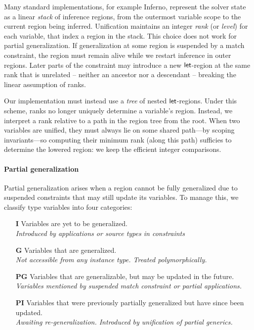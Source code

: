 \documentclass[acmsmall,screen,nonacm,review]{acmart}
\begin{document}

Many standard \ML implementations, for example Inferno, represent the
solver state as a linear \emph{stack} of inference regions, from the
outermost variable scope to the current region being inferred. Unification maintains an integer \emph{rank} (or \emph{level}) for each variable, that index a region in the stack.
%
This choice does not work for partial generalization. If
generalization at some region is suspended by a match constraint, the
region must remain alive while we restart inference in outer
regions. Later parts of the constraint may introduce a new
$\mathopen{}\mathrel{\mathsf{let}}$-region at the same rank that is unrelated -- neither an
ancestor nor a descendant -- breaking the linear assumption of ranks.

Our implementation must instead use a \emph{tree} of nested
$\mathopen{}\mathrel{\mathsf{let}}$-regions. Under this scheme, ranks no longer uniquely determine
a variable's region. Instead, we interpret a rank relative to a path in the region tree from the root. When two variables are
unified, they must always lie on some shared path---by scoping
invariants---so computing their minimum rank (along this path)
sufficies to determine the lowered region: we keep the efficient integer comparisons.

\paragraph{Partial generalization}

Partial generalization arises when a region cannot be fully
generalized due to suspended constraints that may still update
its variables. To manage this, we classify type variables
into four categories:

\begin{itemize}
  \item[\textbf{I}] Variables are yet to be generalized. \\
    \emph{Introduced by applications or source types in constraints}

  \item[\textbf{G}] Variables that are generalized. \\
    \emph{Not accessible from any instance type. Treated polymorphically.}

  \item[\textbf{PG}] Variables that are generalizable, but may be
    updated in the future. \\
    \emph{Variables mentioned by suspended match constraint or partial applications.}

  \item[\textbf{PI}] Variables that were previously partially generalized
    but have since been updated.  \\
    \emph{Awaiting re-generalization. Introduced by unification of partial generics.}
\end{itemize}
\end{document}
